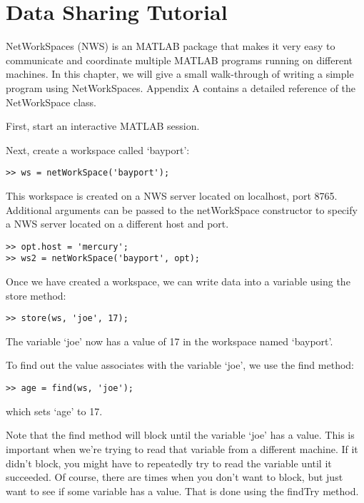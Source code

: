 \section{Data Sharing Tutorial}
NetWorkSpaces (NWS) is an MATLAB package that makes it very easy to
communicate and coordinate multiple MATLAB programs running on different
machines.  In this chapter, we will give a small walk-through of writing
a simple program using NetWorkSpaces.  Appendix A
contains a detailed reference of the NetWorkSpace class.

First, start an interactive MATLAB session.

Next, create a workspace called `bayport':

\begin{verbatim}
>> ws = netWorkSpace('bayport');
\end{verbatim}

This workspace is created on a NWS server located on localhost, port
8765.  Additional arguments can be passed to the netWorkSpace
constructor to specify a NWS server located on a different host and
port.

\begin{samepage}
\begin{verbatim}
>> opt.host = 'mercury';
>> ws2 = netWorkSpace('bayport', opt);
\end{verbatim}
\end{samepage}

Once we have created a workspace, we can write data into a variable
using the store method:

\begin{verbatim}
>> store(ws, 'joe', 17);
\end{verbatim}

The variable `joe' now has a value of 17 in the workspace named
`bayport'.

To find out the value associates with the variable `joe', we use the
find method:

\begin{verbatim}
>> age = find(ws, 'joe');
\end{verbatim}

which sets `age' to 17.

Note that the find method will block until the variable `joe' has a
value.  This is important when we're trying to read that variable from a
different machine.  If it didn't block, you might have to repeatedly try
to read the variable until it succeeded.  Of course, there are times
when you don't want to block, but just want to see if some variable has
a value.  That is done using the findTry method.

